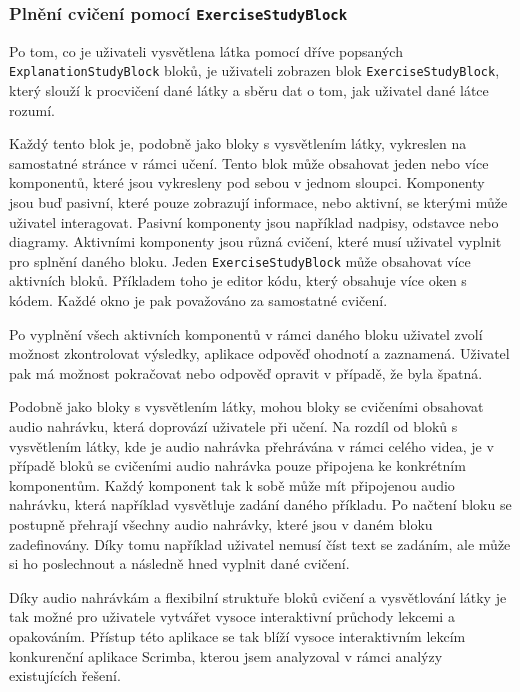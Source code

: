 
\subsubsection{Plnění cvičení pomocí \texttt{ExerciseStudyBlock}}

Po tom, co je uživateli vysvětlena látka pomocí dříve popsaných \texttt{ExplanationStudyBlock} bloků, je uživateli zobrazen blok \texttt{ExerciseStudyBlock}, který slouží k procvičení dané látky a sběru dat o tom, jak uživatel dané látce rozumí.

Každý tento blok je, podobně jako bloky s vysvětlením látky, vykreslen na samostatné stránce v rámci učení. Tento blok může obsahovat jeden nebo více komponentů, které jsou vykresleny pod sebou v jednom sloupci. Komponenty jsou buď pasivní, které pouze zobrazují informace, nebo aktivní, se kterými může uživatel interagovat. Pasivní komponenty jsou například nadpisy, odstavce nebo diagramy. Aktivními komponenty jsou různá cvičení, které musí uživatel vyplnit pro splnění daného bloku. Jeden \texttt{ExerciseStudyBlock} může obsahovat více aktivních bloků. Příkladem toho je editor kódu, který obsahuje více oken s kódem. Každé okno je pak považováno za samostatné cvičení.


Po vyplnění všech aktivních komponentů v rámci daného bloku uživatel zvolí možnost zkontrolovat výsledky, aplikace odpověď ohodnotí a zaznamená. Uživatel pak má možnost pokračovat nebo odpověď opravit v případě, že byla špatná.

Podobně jako bloky s vysvětlením látky, mohou bloky se cvičeními obsahovat audio nahrávku, která doprovází uživatele při učení. Na rozdíl od bloků s vysvětlením látky, kde je audio nahrávka přehrávána v rámci celého videa, je v případě bloků se cvičeními audio nahrávka pouze připojena ke konkrétním komponentům. Každý komponent tak k sobě může mít připojenou audio nahrávku, která například vysvětluje zadání daného příkladu. Po načtení bloku se postupně přehrají všechny audio nahrávky, které jsou v daném bloku zadefinovány. Díky tomu například uživatel nemusí číst text se zadáním, ale může si ho poslechnout a následně hned vyplnit dané cvičení.

Díky audio nahrávkám a flexibilní struktuře bloků cvičení a vysvětlování látky je tak možné pro uživatele vytvářet vysoce interaktivní průchody lekcemi a opakováním. Přístup této aplikace se tak blíží vysoce interaktivním lekcím konkurenční aplikace Scrimba, kterou jsem analyzoval v rámci analýzy existujících řešení.


